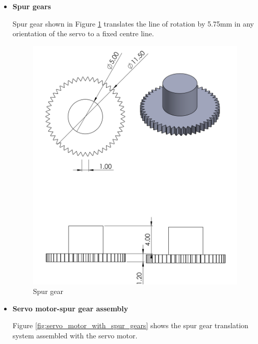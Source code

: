\begin{enumerate}
\begin{enumerate}
\begin{enumerate}
          \begin{itemize}
              \item \textbf{Spur gears}
              \par
              Spur gear shown in Figure \ref{fig:spur_gear} translates the line of rotation by 5.75mm in any orientation of the servo to a fixed centre line.
              \begin{figure}[H]
                  \centering
                  \includegraphics{Figures/SpurGear1.PNG}
                  \caption{Spur gear}
                  \label{fig:spur_gear}
              \end{figure}
              \par 
              \item  \textbf{Servo motor-spur gear assembly}
              \par
              Figure \ref{fig:servo_motor_with_spur_gears} shows the spur gear translation system assembled with the servo motor.
              \begin{figure}[H]
                  \centering

\end{figure}
\end{itemize}
\end{enumerate}
\end{enumerate}
\end{enumerate}
